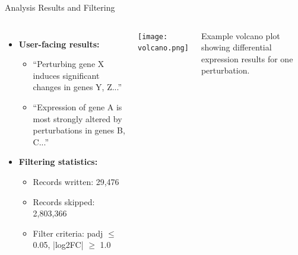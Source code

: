 \documentclass[handout]{beamer}
\begin{document}
\begin{frame}{Analysis Results and Filtering}
    \begin{columns}
        \begin{itemize}
            \item \textbf{User-facing results:}
            \begin{itemize}
                \item ``Perturbing gene X induces significant changes in genes Y, Z...''
                \item ``Expression of gene A is most strongly altered by perturbations in genes B, C...''
            \end{itemize}
            \item \textbf{Filtering statistics:}
            \begin{itemize}
                \item Records written: 29,476
                \item Records skipped: 2,803,366
                \item Filter criteria: padj $\leq$ 0.05, |log2FC| $\geq$ 1.0
            \end{itemize}
        \end{itemize}
        
        \centering
        \texttt{[image: volcano.png]}
        
        \small Example volcano plot showing differential expression results for one perturbation.
    \end{columns}
\end{frame}
\end{document}
